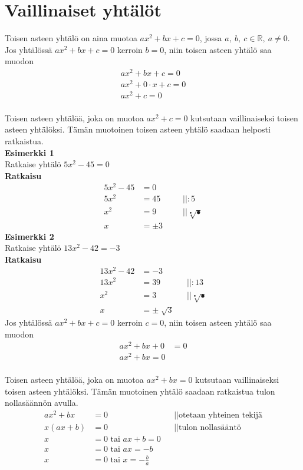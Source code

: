 \section{Vaillinaiset yhtälöt}
Toisen asteen yhtälö on aina muotoa $ax^2+bx+c=0$, jossa $a, \ b, \ c \in \mathbb{R}, \ a \neq 0$. \\ 
Jos yhtälössä $ax^2+bx+c=0$ kerroin $b=0$, niin toisen asteen yhtälö saa muodon
\begin{align*}
ax^2+bx+c=0 \\
ax^2+0 \cdot x+c=0 \\
ax^2+c=0 
\end{align*}
 \\
Toisen asteen yhtälöä, joka on muotoa $ax^2+c=0$ kutsutaan vaillinaiseksi toisen asteen yhtälöksi. Tämän muotoinen toisen asteen yhtälö saadaan helposti ratkaistua.\\ 
\textbf{Esimerkki 1} \\
Ratkaise yhtälö $5x^2-45=0$ \\
\textbf{Ratkaisu} 
\begin{align*}
5x^2-45&=0 \\
5x^2&=45  \ \ \ \ \ &&||:5 \\
x^2&=9 &&|| \sqrt[•]{•} \\
x&= \pm 3   
\end{align*}
\textbf{Esimerkki 2} \\ 
Ratkaise yhtälö $13x^2-42=-3$ \\
\textbf{Ratkaisu} \\
\begin{align*}
13x^2-42&=-3 \\
13x^2&=39 \ \ \ \ \ &&||:13 \\
x^2&=3 \ \ \ \ \ &&|| \sqrt[•]{•} \\
x&=\pm \sqrt[]{3}
\end{align*}
Jos yhtälössä $ax^2+bx+c=0$ kerroin $c=0$, niin toisen asteen yhtälö saa muodon
\begin{align*}
ax^2+bx+0&=0 \\
ax^2+bx=0
\end{align*}
 \\
Toisen asteen yhtälöä, joka on muotoa $ax^2+bx=0$ kutsutaan vaillinaiseksi toisen asteen yhtälöksi. Tämän muotoinen yhtälö saadaan ratkaistua tulon nollasäännön avulla. \\
\begin{align*}
ax^2+bx&=0 \ \ \ \ \ &&||\text{otetaan yhteinen tekijä} \\
x(ax+b)&=0 \ \ \ \ \ &&||\text{tulon nollasääntö} \\
x&=0 \text{ tai } ax+b=0 \\
x&=0 \text{ tai } ax=-b \\
x&=0 \text{ tai } x=-\frac{b}{a}
\end{align*}
